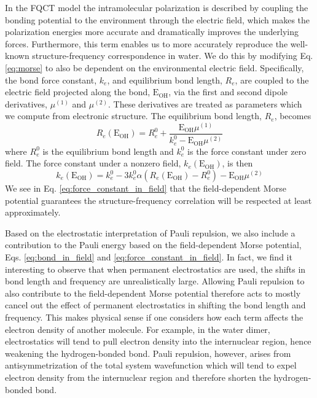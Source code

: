 \documentclass[journal=jctcce,manuscript=article]{achemso}
\begin{document}
In the FQCT model the intramolecular polarization is described by coupling the bonding potential to the environment through the electric field, which makes the polarization energies more accurate and dramatically improves the underlying forces. Furthermore, this term enables us to more accurately reproduce the well-known structure-frequency correspondence in water.\cite{boyer2019beyond} We do this by modifying Eq. \ref{eq:morse} to also be dependent on the environmental electric field.\cite{boyer2019beyond} Specifically, the bond force constant, $k_e$, and equilibrium bond length, $R_e$, are coupled to the electric field projected along the bond, $\mathrm{E_{OH}}$, via the first and second dipole derivatives, $\mu^{(1)}$ and $\mu^{(2)}$. These derivatives are treated as parameters which we compute from electronic structure. The equilibrium bond length, $R_e$, becomes
\begin{equation}
  R_e(\mathrm{E_{OH}})=R_e^0+ \frac{\mathrm{E_{OH}}\mu^{(1)}}{k_e^0-\mathrm{E_{OH}}\mu^{(2)}}
  \label{eq:bond_in_field}
\end{equation}
where $R_e^0$ is the equilibrium bond length and $k_e^0$ is the force constant under zero field. The force constant under a nonzero field, $k_e(\mathrm{E_{OH}})$, is then
\begin{equation}
  k_e(\mathrm{E_{OH}})=k_e^0-3k_e^0\alpha\left(R_e(\mathrm{E_{OH}})-R_e^0\right)-\mathrm{E_{OH}}\mu^{(2)}
  \label{eq:force_constant_in_field}
\end{equation}
We see in Eq. \ref{eq:force_constant_in_field} that the field-dependent Morse potential guarantees the structure-frequency correlation will be respected at least approximately.

Based on the electrostatic interpretation of Pauli repulsion, we also include a contribution to the Pauli energy based on the field-dependent Morse potential, Eqs. \ref{eq:bond_in_field} and \ref{eq:force_constant_in_field}. In fact, we find it interesting to observe that when permanent electrostatics are used, the shifts in bond length and frequency are unrealistically large. Allowing Pauli repulsion to also contribute to the field-dependent Morse potential therefore acts to mostly cancel out the effect of permanent electrostatics in shifting the bond length and frequency. This makes physical sense if one considers how each term affects the electron density of another molecule. For example, in the water dimer, electrostatics will tend to pull electron density into the internuclear region, hence weakening the hydrogen-bonded  bond. Pauli repulsion, however, arises from antisymmetrization of the total system wavefunction which will tend to expel electron density from the internuclear region and therefore shorten the hydrogen-bonded  bond.
\end{document}
